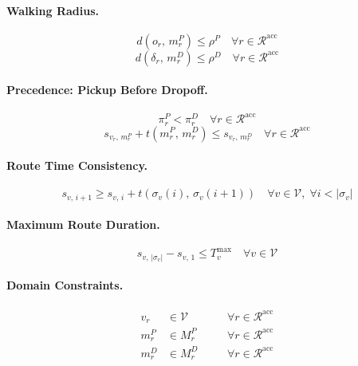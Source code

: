\paragraph{Walking Radius.}
\begin{equation}\label{con:walk-pickup}
  d(o_r,\, m_r^P) \leq \rho^P \quad \forall r \in \mathcal{R}^{\text{acc}}
\end{equation}
\begin{equation}\label{con:walk-dropoff}
  d(\delta_r,\, m_r^D) \leq \rho^D \quad \forall r \in \mathcal{R}^{\text{acc}}
\end{equation}

\paragraph{Precedence: Pickup Before Dropoff.}
\begin{equation}\label{con:precedence-pos}
  \pi_r^P < \pi_r^D \quad \forall r \in \mathcal{R}^{\text{acc}}
\end{equation}
\begin{equation}\label{con:precedence-time}
  s_{v_r,\, m_r^P} + t(m_r^P,\, m_r^D) \leq s_{v_r,\, m_r^D} \quad \forall r \in \mathcal{R}^{\text{acc}}
\end{equation}

\paragraph{Route Time Consistency.}
\begin{equation}\label{con:time-consistency}
  s_{v,\, i+1} \geq s_{v,\, i} + t(\sigma_v(i),\, \sigma_v(i+1))
  \quad \forall v \in \mathcal{V},\; \forall i < |\sigma_v|
\end{equation}

\paragraph{Maximum Route Duration.}
\begin{equation}\label{con:route-duration}
  s_{v,\, |\sigma_v|} - s_{v,\, 1} \leq T_v^{\max} \quad \forall v \in \mathcal{V}
\end{equation}

\paragraph{Domain Constraints.}
\begin{align}
  v_r &\in \mathcal{V} \quad &&\forall r \in \mathcal{R}^{\text{acc}} \label{con:domain-v}\\
  m_r^P &\in M_r^P \quad &&\forall r \in \mathcal{R}^{\text{acc}} \label{con:domain-mp}\\
  m_r^D &\in M_r^D \quad &&\forall r \in \mathcal{R}^{\text{acc}} \label{con:domain-md}
\end{align}

